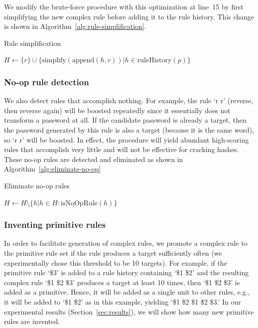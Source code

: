 \documentclass{article}
\begin{document}
We modify the brute-force procedure with this optimization at line~15 by
first simplifying the new complex rule before adding it to the rule history.
This change is shown in Algorithm~\ref{alg:rule-simplification}.

\begin{algorithm}[h!]\caption{Rule simplification}
\begin{algorithmic}
    \State $H \gets \{r\}\cup\{\mathrm{simplify}(\mathrm{append}(h, r))|h \in%
\mathrm{ruleHistory}(p)\}$
\end{algorithmic}
\label{alg:rule-simplification}
\end{algorithm}

\subsubsection{No-op rule detection}

We also detect rules that accomplish nothing. For example, the rule `r r'
(reverse, then reverse again) will be boosted repeatedly since it essentially
does not transform a password at all. If the candidate password is already a
target, then the password generated by this rule is also a target (because it
is the same word), so `r r' will be boosted. In effect, the procedure will
yield abundant high-scoring rules that accomplish very little and will not be
effective for cracking hashes. These no-op rules are detected and eliminated as
shown in Algorithm~\ref{alg:eliminate-no-op}

\begin{algorithm}[h!]\caption{Eliminate no-op rules}
\begin{algorithmic}
    \State $H \gets H \setminus \{h|h\in H : \textrm{isNoOpRule}(h)\}$
\end{algorithmic}
\label{alg:eliminate-no-op}
\end{algorithm}

\subsubsection{Inventing primitive rules}

In order to facilitate generation of complex rules, we promote a complex rule
to the primitive rule set if the rule produces a target sufficiently often (we
experimentally chose this threshold to be 10 targets). For example, if the
primitive rule `\$3' is added to a rule history containing `\$1 \$2' and the
resulting complex rule `\$1 \$2 \$3' produces a target at least 10 times, then
`\$1 \$2 \$3' is added as a primitive. Hence, it will be added as a
single unit to other rules, e.g., it will be added to `\$1 \$2' as in this
example, yielding `\$1 \$2 \$1 \$2 \$3.' In our experimental results
(Section~\ref{sec:results}),
we will show how many new primitive rules are invented.
\end{document}
